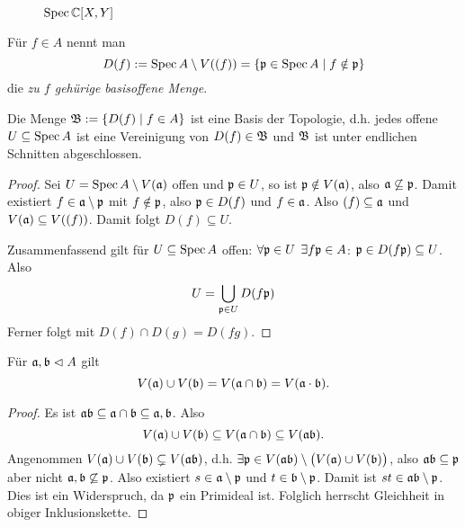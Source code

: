 \begin{figure}
	\caption{$\operatorname{Spec} \mathbb{C}[X,Y]$}
	\label{fig:spec c xy}
	\centering
\end{figure}


\begin{definition}
	Für $f\in A$ nennt man
	\[ D(f) := \operatorname{Spec} A \setminus V((f)) = \{ \mathfrak{p} \in \operatorname{Spec} A \mid f \notin \mathfrak{p}\}
	\]
	die \emph{zu $f$ gehürige basisoffene Menge}.
\end{definition}

\begin{lemma}
	\label{lemma:basisoffene mengen sind basis}
	Die Menge $\mathfrak B := \{D(f) \mid f \in A\}$ ist eine Basis der
	Topologie, d.h. jedes offene $U\subseteq \operatorname{Spec} A$ ist eine Vereinigung
	von $D(f) \in \mathfrak B$ und $\mathfrak B$ ist unter endlichen Schnitten 
	abgeschlossen.  
\end{lemma}
\begin{proof}
	Sei $U = \operatorname{Spec} A \setminus V(\mathfrak{a})$ offen und $\mathfrak{p} \in U$, so ist
	$\mathfrak{p} \notin V(\mathfrak{a})$, also $\mathfrak{a} \not\subseteq \mathfrak{p}$. Damit existiert
	$f \in \mathfrak{a} \setminus \mathfrak{p}$ mit $f \notin \mathfrak{p}$, also $\mathfrak{p} \in D(f)$
	und $f \in \mathfrak{a}$. Also $(f) \subseteq \mathfrak{a}$ und
	$V(\mathfrak{a}) \subseteq V((f))$. Damit folgt $D(f) \subseteq U$.
	
	Zusammenfassend gilt für $U\subseteq \operatorname{Spec} A$ offen: $\forall \mathfrak{p} \in U$
	$\exists f\mathfrak{p} \in A$: $\mathfrak{p} \in D(f\mathfrak{p}) \subseteq U$.
	Also
	\[ U = \bigcup_{\mathfrak{p} \in U} D(f\mathfrak{p})\]
	Ferner folgt mit 
	$D(f) \cap D(g) = D(fg)$.
\end{proof}

\begin{lemma}
	\label{lemma:vereinigungen von v sind produkt}
	Für $\mathfrak{a}, \mathfrak b\vartriangleleft A$ gilt
	\[
		V(\mathfrak{a}) \cup V(\mathfrak b) = V(\mathfrak{a} \cap \mathfrak b) = V(\mathfrak{a} \cdot \mathfrak b).
	\]
\end{lemma}
\begin{proof}
	Es ist 
	$\mathfrak{a}\mathfrak b \subseteq \mathfrak{a} \cap \mathfrak b \subseteq \mathfrak{a}, \mathfrak b$.
	Also 
	\[V(\mathfrak{a}) \cup V(\mathfrak b) \subseteq V(\mathfrak{a} \cap \mathfrak b) 
	\subseteq V(\mathfrak{a}\mathfrak b).\]
	Angenommen $V(\mathfrak{a}) \cup V(\mathfrak b) \subsetneq V(\mathfrak{a}\mathfrak b)$, 
	d.h. $\exists \mathfrak{p} \in V(\mathfrak{a} \mathfrak b) \setminus \big(V(\mathfrak{a}) \cup V(\mathfrak b)\big)$,
	also $\mathfrak{a}\mathfrak b \subseteq \mathfrak{p}$ aber nicht
	$\mathfrak{a},\mathfrak b \not \subseteq \mathfrak{p}$.
	Also existiert $s \in \mathfrak{a} \setminus \mathfrak{p}$ und $t\in\mathfrak b\setminus \mathfrak{p}$.
	Damit ist $st \in \mathfrak{a}\mathfrak b \setminus \mathfrak{p}$.
	Dies ist ein Widerspruch, da $\mathfrak{p}$ ein Primideal ist.
	Folglich herrscht Gleichheit in obiger Inklusionskette.
\end{proof}

